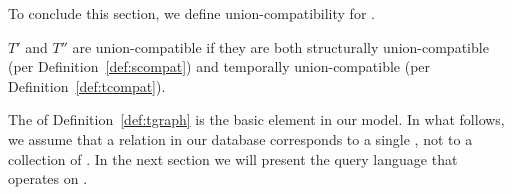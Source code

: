 To conclude this section, we define union-compatibility for \tgs.

\begin{definition} 
\label{def:tuc} 
$T'$ and $T''$ are union-compatible \tgs if they are both
structurally union-compatible (per Definition~\ref{def:scompat}) and
temporally union-compatible (per Definition~\ref{def:tcompat}).
\end{definition}

The \tg of Definition~\ref{def:tgraph} is the basic element in our
model.  In what follows, we assume that a relation in our database
corresponds to a single \tg, not to a collection of \tgs.  In the next
section we will present the \ql query language that operates on \tgs.




